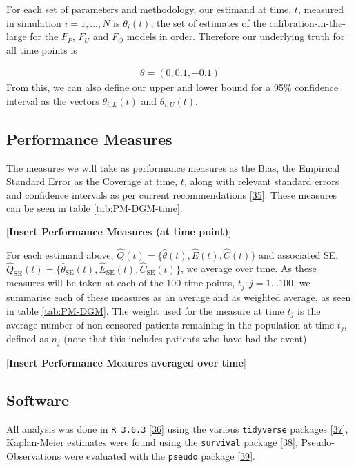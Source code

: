 \documentclass[12pt,PhD,twoside,openright]{muthesis}
\begin{document}
For each set of parameters and methodology, our estimand at time, \(t\), measured in simulation \(i = 1,...,N\) is \(\theta_i(t)\), the set of estimates of the calibration-in-the-large for the \(F_P\), \(F_U\) and \(F_O\) models in order. Therefore our underlying truth for all time points is

\[\begin{array}{c}
\theta = \left(0,0.1,-0.1\right)
\end{array}\]
From this, we can also define our upper and lower bound for a 95\% confidence interval as the vectors \(\theta_{i,L}(t)\) and \(\theta_{i,U}(t)\).

\hypertarget{performance-measures}{%
\subsection{Performance Measures}\label{performance-measures}}

The measures we will take as performance measures as the Bias, the Empirical Standard Error as the Coverage at time, \(t\), along with relevant standard errors and confidence intervals as per current recommendations {[}\protect\hyperlink{ref-morris_using_2019}{35}{]}. These measures can be seen in table \ref{tab:PM-DGM-time}.

{[}\textbf{Insert Performance Measures (at time point)}{]}

For each estimand above, \(\hat{Q}(t) = \{\hat{\theta}(t),\hat{E}(t), \hat{C}(t)\}\) and associated SE, \(\hat{Q}_\textrm{SE}(t) = \{\hat{\theta}_\textrm{SE}(t),\hat{E}_\textrm{SE}(t), \hat{C}_\textrm{SE}(t)\}\), we average over time. As these measures will be taken at each of the 100 time points, \(t_j:j=1...100\), we summarise each of these measures as an average and as weighted average, as seen in table \ref{tab:PM-DGM}. The weight used for the measure at time \(t_j\) is the average number of non-censored patients remaining in the population at time \(t_j\), defined as \(n_j\) (note that this includes patients who have had the event).

{[}\textbf{Insert Performance Meaures averaged over time}{]}

\hypertarget{software}{%
\subsection{Software}\label{software}}

All analysis was done in \texttt{R\ 3.6.3} {[}\protect\hyperlink{ref-r_core_team_r_nodate}{36}{]} using the various \texttt{tidyverse} packages {[}\protect\hyperlink{ref-wickham_tidy_2017}{37}{]}, Kaplan-Meier estimates were found using the \texttt{survival} package {[}\protect\hyperlink{ref-therneau_package_2020}{38}{]}, Pseudo-Observations were evaluated with the \texttt{pseudo} package {[}\protect\hyperlink{ref-perme_pseudo_2017}{39}{]}.
\end{document}
